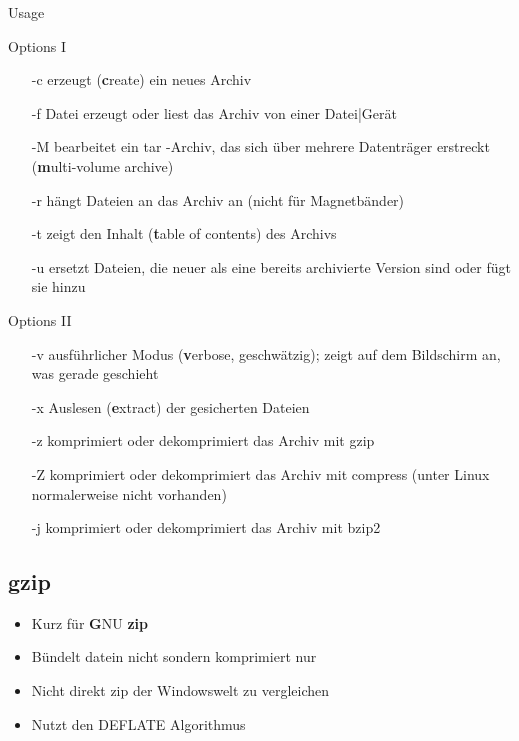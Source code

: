 \documentclass[aspectratio=43]{beamer}
\begin{document}
\begin{frame} 
	\begin{exampleblock}{Usage}
	\end{exampleblock}

	\begin{exampleblock}{Options I}
	\begin{itemize}
	\item[-c] erzeugt (\textbf{c}reate) ein neues Archiv
	\item[-f] Datei erzeugt oder liest das Archiv von einer Datei|Gerät
	\item[-M] bearbeitet ein tar -Archiv, das sich über mehrere Datenträger erstreckt (\textbf{m}ulti-volume archive)
	\item[-r] hängt Dateien an das Archiv an (nicht für Magnetbänder)
	\item[-t]  zeigt den Inhalt (\textbf{t}able of contents) des Archivs
	\item[-u] ersetzt Dateien, die neuer als eine bereits archivierte Version sind oder fügt sie hinzu
	\end{itemize}
	\end{exampleblock}
\end{frame}

\begin{frame} 
	\begin{exampleblock}{Options II}
	\begin{itemize}

	\item[-v] ausführlicher Modus (\textbf{v}erbose, geschwätzig); zeigt auf dem Bildschirm an,
was gerade geschieht
	\item[-x]
 Auslesen (\textbf{e}xtract) der gesicherten Dateien
	\item[-z] komprimiert oder dekomprimiert das Archiv mit gzip
\item[-Z] komprimiert oder dekomprimiert das Archiv mit compress (unter Linux normalerweise nicht vorhanden)
\item[-j] komprimiert oder dekomprimiert das Archiv mit bzip2
	\end{itemize}
	\end{exampleblock}

	
\end{frame}


\subsection{gzip}
\begin{frame} 
	\begin{block}{} 
	\begin{itemize}
	\item Kurz für \textbf{G}NU \textbf{zip}
	\item Bündelt datein nicht sondern komprimiert nur
	\item Nicht direkt zip der Windowswelt zu vergleichen
	\item Nutzt den DEFLATE Algorithmus
	\end{itemize}
	\end{block}
\end{frame}
\end{document}
